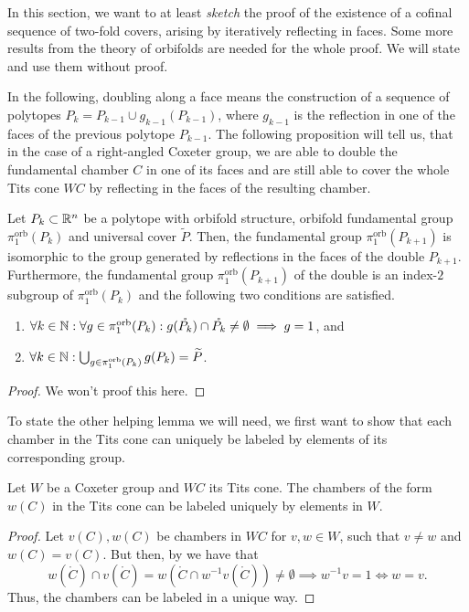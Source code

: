 In this section, we want to at least \emph{sketch} the proof of the existence of a cofinal sequence of two-fold covers, arising by iteratively reflecting in faces.
Some more results from the theory of orbifolds are needed for the whole proof.
We will state and use them without proof.

In the following, doubling along a face means the construction of a sequence of polytopes \(P_k = P_{k-1} \cup g_{k-1}(P_{k-1})\), where \(g_{k-1}\) is the reflection in one of the faces of the previous polytope \(P_{k-1}\).
The following proposition will tell us, that in the case of a right-angled Coxeter group, we are able to double the fundamental chamber \(C\) in one of its faces and are still able to cover the whole Tits cone \(WC\) by reflecting in the faces of the resulting chamber.

\begin{proposition}\label{prop:double}
    Let \(P_k \subset \mathbb{R}^n\) be a polytope with orbifold structure, orbifold fundamental group \(\pi_1^{\text{orb}}(P_k)\) and universal cover \(\widetilde{P}\).
    Then, the fundamental group \(\pi_1^{\text{orb}}(P_{k+1})\) is isomorphic to the group generated by reflections in the faces of the double \(P_{k+1}\).
    Furthermore, the fundamental group \(\pi_1^{\text{orb}}(P_{k+1})\) of the double is an index-\(2\) subgroup of \(\pi_1^{\text{orb}}(P_k)\) and the following two conditions are satisfied.
    \begin{enumerate}
        \item \(\forall k \in \mathbb{N}: \forall g \in \pi_1^{\text{orb}}(P_k): g(\mathring{P_k}) \cap \mathring{P_k} \neq \emptyset \implies g = 1\), and
        \item \(\forall k \in \mathbb{N}: \bigcup_{g \in \pi_1^{\text{orb}}(P_k)} g(P_{k}) = \widetilde{P}\).
    \end{enumerate}
\end{proposition}
\begin{proof}
    We won't proof this here.
\end{proof}

To state the other helping lemma we will need, we first want to show that each chamber in the Tits cone can uniquely be labeled by elements of its corresponding group.

\begin{lemma}\label{lem:labels}
    Let \(W\) be a Coxeter group and \(WC\) its Tits cone.
    The chambers of the form \(w(C)\) in the Tits cone can be labeled uniquely by elements in \(W\).
\end{lemma}
\begin{proof}
    Let \(v(C), w(C)\) be chambers in \(WC\) for \(v, w \in W\), such that \(v \neq w\) and \(w(C) = v(C)\).\newline
    But then, by  we have that
    \[w(\mathring{C}) \cap v(\mathring{C}) = w(\mathring{C} \cap w^{-1}v(\mathring{C})) \neq \emptyset \implies w^{-1}v = 1 \iff w = v.\]
    Thus, the chambers can be labeled in a unique way.
\end{proof}

